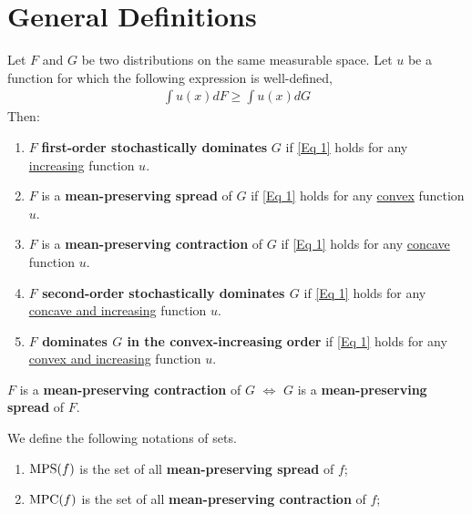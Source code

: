 \documentclass[11pt]{elegantbook}
\begin{document}
\section{General Definitions}
\begin{definition}\label{Defn SD}
    \normalfont
    Let $F$ and $G$ be two distributions on the same measurable space. Let $u$ be a function for which the following expression is well-defined,
    \begin{equation}
        \begin{aligned}
            \int u(x)dF\geq \int u(x)dG
        \end{aligned}
        \label{Eq 1}
    \end{equation}
    Then:
    \begin{enumerate}[$\bullet$]
        \item $F$ \textbf{first-order stochastically dominates} $G$ if \ref{Eq 1} holds for any \underline{increasing} function $u$.
        \item $F$ is a \textbf{mean-preserving spread} of $G$ if \ref{Eq 1} holds for any \underline{convex} function $u$.
        \item $F$ is a \textbf{mean-preserving contraction} of $G$ if \ref{Eq 1} holds for any \underline{concave} function $u$.
        \item \textbf{$F$ second-order stochastically dominates $G$} if \ref{Eq 1} holds for any \underline{concave and increasing} function $u$.
        \item \textbf{$F$ dominates $G$ in the convex-increasing order} if \ref{Eq 1} holds for any \underline{convex and increasing} function $u$.
    \end{enumerate}
\end{definition}
\begin{note}
    $F$ is a \textbf{mean-preserving contraction} of $G$ $\Leftrightarrow$ $G$ is a \textbf{mean-preserving spread} of $F$.
\end{note}

\begin{definition}
    \normalfont
    We define the following notations of sets.
    \begin{enumerate}[$\circ$]
        \item $\textnormal{MPS}(f)$ is the set of all \textbf{mean-preserving spread} of $f$;
        \item $\textnormal{MPC}(f)$ is the set of all \textbf{mean-preserving contraction} of $f$;
    \end{enumerate}
\end{definition}
\end{document}
